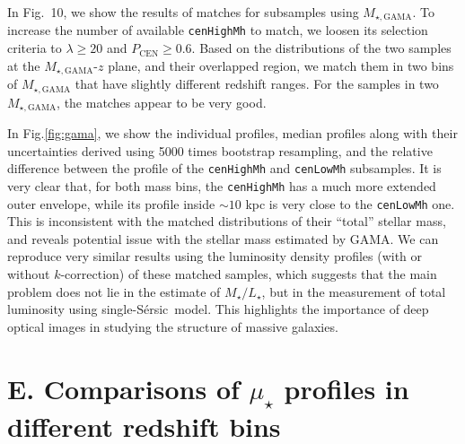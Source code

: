 \documentclass{emulateapj}
\def\ser{{S\'{e}rsic\ }}
\def\rbcg{\texttt{cenHighMh}}
\def\nbcg{\texttt{cenLowMh}}
\def\m2l{{$M_{\star}/L_{\star}$}}
\def\mden{{$\mu_{\star}$}}
\begin{document}
\begin{CJK*}{UTF8}{gbsn}
    
    In Fig.~10, we show the results of matches for subsamples using 
    $M_{\star, \mathrm{GAMA}}$.  
    To increase the number of available \rbcg{} to match, we loosen 
    its selection criteria to $\lambda \ge 20$ and $P_{\mathrm{CEN}} \ge 0.6$.
    Based on the distributions of the two samples at the $M_{\star, \mathrm{GAMA}}$-$z$ 
    plane, and their overlapped region, we match them in two bins of 
    $M_{\star, \mathrm{GAMA}}$ that have slightly different redshift ranges. 
    For the samples in two $M_{\star, \mathrm{GAMA}}$, the matches appear to be
    very good.  
    
    In Fig.\ref{fig:gama}, we show the individual profiles, median profiles along with their 
    uncertainties derived using 5000 times bootstrap resampling, and the relative 
    difference between the profile of the \rbcg{} and \nbcg{} 
    subsamples.  
    It is very clear that, for both mass bins, the \rbcg{} has a much 
    more extended outer envelope, while its profile inside $\sim 10$ kpc is 
    very close to the \nbcg{} one.  
    This is inconsistent with the matched distributions of their ``total'' 
    stellar mass, and reveals potential issue with the stellar mass estimated 
    by GAMA.
    We can reproduce very similar results using the luminosity density profiles 
    (with or without $k$-correction) of these matched samples, which suggests 
    that the main problem does not lie in the estimate of \m2l{}, but in the 
    measurement of total luminosity using single-\ser model.  
    This highlights the importance of deep optical images in studying the 
    structure of massive galaxies. 



\section{E. Comparisons of \mden{} profiles in different redshift bins}
    \label{app:D}


\end{CJK*}
\end{document}
